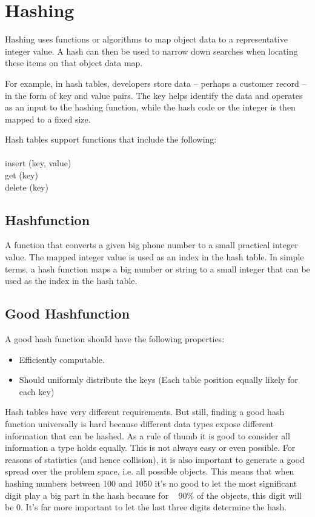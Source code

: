 \documentclass{report}
\begin{document}
\section{\large Hashing}
Hashing\cite{2} uses functions or algorithms to map object data to a representative integer value. A hash can then be used to narrow down searches when locating these items on that object data map.

For example, in hash tables, developers store data -- perhaps a customer record -- in the form of key and value pairs. The key helps identify the data and operates as an input to the hashing function, while the hash code or the integer is then mapped to a fixed size.

Hash tables support functions that include the following: \\
\\
insert (key, value) \\
get (key) \\
delete (key) \\
\subsection{\large Hashfunction}
A function that converts a given big phone number to a small practical integer value. The mapped integer value is used as an index in the hash table. In simple terms, a hash function maps a big number or string to a small integer that can be used as the index in the hash table. 
\subsection{\large Good Hashfunction}
A good hash function should have the following properties: 
\begin{itemize}
    \item Efficiently computable.
    \item Should uniformly distribute the keys (Each table position equally likely for each key)
\end{itemize}
Hash tables have very different requirements. But still, finding a good hash function universally is hard because different data types expose different information that can be hashed. As a rule of thumb it is good to consider all information a type holds equally. This is not always easy or even possible. For reasons of statistics (and hence collision), it is also important to generate a good spread over the problem space, i.e. all possible objects. This means that when hashing numbers between 100 and 1050 it's no good to let the most significant digit play a big part in the hash because for ~ 90\% of the objects, this digit will be 0. It's far more important to let the last three digits determine the hash.
\end{document}
